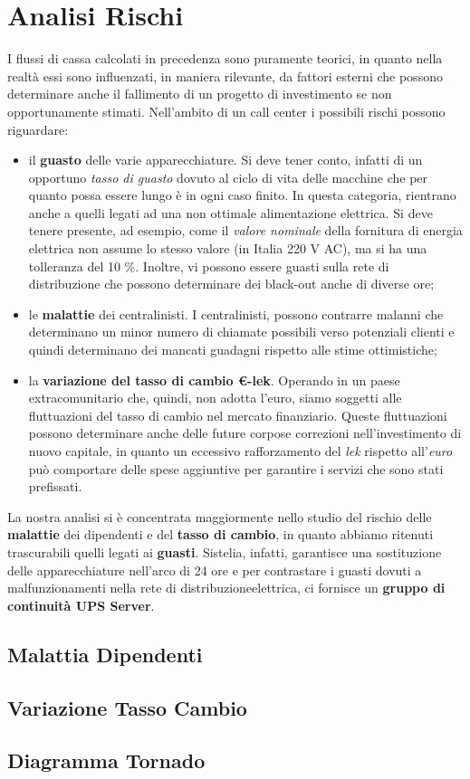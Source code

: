 \chapter[Analisi Rischi]{Analisi Rischi}
I flussi di cassa calcolati in precedenza sono puramente teorici, in quanto nella realtà essi sono influenzati, in maniera rilevante, da fattori esterni che possono determinare anche il fallimento di un progetto di investimento se non opportunamente stimati.
Nell'ambito di un call center i possibili rischi possono riguardare:
\begin{itemize}
\item il \textbf{guasto} delle varie apparecchiature. Si deve tener conto, infatti di un opportuno \textit{tasso di guasto} dovuto al ciclo di vita delle macchine che per quanto possa essere lungo è in ogni caso finito. In questa categoria, rientrano anche a quelli legati ad una non ottimale alimentazione elettrica. Si deve tenere presente, ad esempio, come il \textit{valore nominale} della fornitura di energia elettrica non assume lo stesso valore (in Italia 220 V AC), ma si ha una tolleranza del 10 \%\cite{norma_cei}. Inoltre, vi possono essere guasti sulla rete di distribuzione che possono determinare dei black-out anche di diverse ore;
\item le \textbf{malattie} dei centralinisti. I centralinisti, possono contrarre malanni che determinano un minor numero di chiamate possibili verso potenziali clienti e quindi determinano dei mancati guadagni rispetto alle stime ottimistiche;
\item la \textbf{variazione del tasso di cambio \euro -lek}. Operando in un paese extracomunitario che, quindi, non adotta l'euro, siamo soggetti alle fluttuazioni del tasso di cambio nel mercato finanziario. Queste fluttuazioni possono determinare anche delle future corpose correzioni nell'investimento di nuovo capitale, in quanto un eccessivo rafforzamento del \textit{lek} rispetto all'\textit{euro} può comportare delle spese aggiuntive per garantire i servizi che sono stati prefissati.  
\end{itemize} 
La nostra analisi si è concentrata maggiormente nello studio del rischio delle \textbf{malattie} dei dipendenti e del \textbf{tasso di cambio}, in quanto abbiamo ritenuti trascurabili quelli legati ai \textbf{guasti}. Sistelia, infatti, garantisce una sostituzione delle apparecchiature nell'arco di 24 ore e per contrastare i guasti dovuti a malfunzionamenti nella rete di distribuzioneelettrica, ci fornisce un \textbf{gruppo di continuità \ac{UPS} Server}.
\clearpage

\section[Malattia Dipendenti]{Malattia Dipendenti}
	

\section[Variazione Tasso Cambio]{Variazione Tasso Cambio}
		
	
\section[Diagramma Tornado]{Diagramma Tornado}	
	